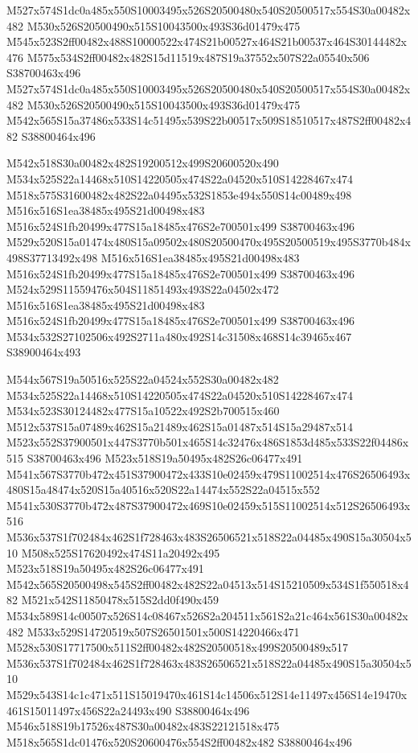 \documentclass{article}
\begin{document}
\begin{multicols}{2}
M527x574S1dc0a485x550S10003495x526S20500480x540S20500517x554S30a00482x482 M530x526S20500490x515S10043500x493S36d01479x475 M545x523S2ff00482x488S10000522x474S21b00527x464S21b00537x464S30144482x476 M575x534S2ff00482x482S15d11519x487S19a37552x507S22a05540x506 S38700463x496 M527x574S1dc0a485x550S10003495x526S20500480x540S20500517x554S30a00482x482 M530x526S20500490x515S10043500x493S36d01479x475 M542x565S15a37486x533S14c51495x539S22b00517x509S18510517x487S2ff00482x482 S38800464x496

M542x518S30a00482x482S19200512x499S20600520x490 M534x525S22a14468x510S14220505x474S22a04520x510S14228467x474 M518x575S31600482x482S22a04495x532S1853e494x550S14c00489x498 M516x516S1ea38485x495S21d00498x483 M516x524S1fb20499x477S15a18485x476S2e700501x499 S38700463x496 M529x520S15a01474x480S15a09502x480S20500470x495S20500519x495S3770b484x498S37713492x498 M516x516S1ea38485x495S21d00498x483 M516x524S1fb20499x477S15a18485x476S2e700501x499 S38700463x496 M524x529S11559476x504S11851493x493S22a04502x472 M516x516S1ea38485x495S21d00498x483 M516x524S1fb20499x477S15a18485x476S2e700501x499 S38700463x496 M534x532S27102506x492S2711a480x492S14c31508x468S14c39465x467 S38900464x493

M544x567S19a50516x525S22a04524x552S30a00482x482 M534x525S22a14468x510S14220505x474S22a04520x510S14228467x474 M534x523S30124482x477S15a10522x492S2b700515x460 M512x537S15a07489x462S15a21489x462S15a01487x514S15a29487x514 M523x552S37900501x447S3770b501x465S14c32476x486S1853d485x533S22f04486x515 S38700463x496 M523x518S19a50495x482S26c06477x491 M541x567S3770b472x451S37900472x433S10e02459x479S11002514x476S26506493x480S15a48474x520S15a40516x520S22a14474x552S22a04515x552 M541x530S3770b472x487S37900472x469S10e02459x515S11002514x512S26506493x516 M536x537S1f702484x462S1f728463x483S26506521x518S22a04485x490S15a30504x510 M508x525S17620492x474S11a20492x495 M523x518S19a50495x482S26c06477x491 M542x565S20500498x545S2ff00482x482S22a04513x514S15210509x534S1f550518x482 M521x542S11850478x515S2dd0f490x459 M534x589S14c00507x526S14c08467x526S2a204511x561S2a21c464x561S30a00482x482 M533x529S14720519x507S26501501x500S14220466x471 M528x530S17717500x511S2ff00482x482S20500518x499S20500489x517 M536x537S1f702484x462S1f728463x483S26506521x518S22a04485x490S15a30504x510 M529x543S14c1c471x511S15019470x461S14c14506x512S14e11497x456S14e19470x461S15011497x456S22a24493x490 S38800464x496 M546x518S19b17526x487S30a00482x483S22121518x475 M518x565S1dc01476x520S20600476x554S2ff00482x482 S38800464x496


\end{multicols}
\end{document}
